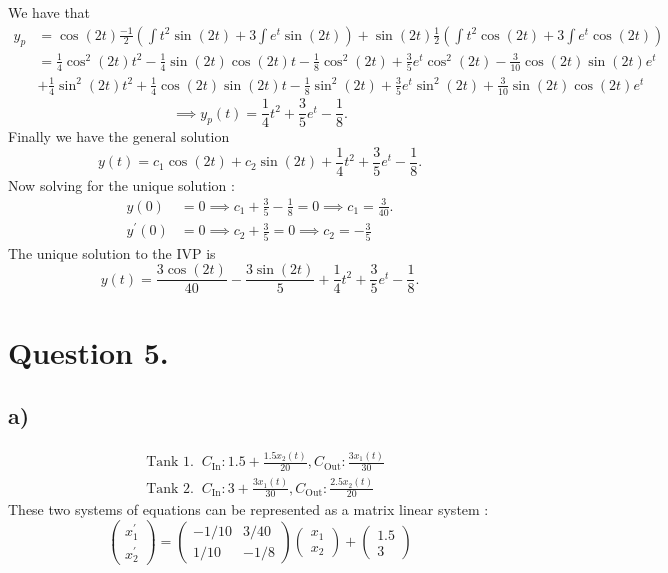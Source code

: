 \documentclass[
	12pt,
	]{article}
\newcommand{\p}{\prime}
\theoremstyle{definition}
\theoremstyle{definition}
\theoremstyle{definition}
\theoremstyle{definition}
\theoremstyle{definition}
\theoremstyle{example}
\theoremstyle{note}
\theoremstyle{remark}
\theoremstyle{example}
\begin{document}
 			 	We have that 
 			 	\begin{align*}
 			 		y_{p} &= \cos(2t)\frac{-1}{2} \left(\int t^{2}\sin(2t) + 3 \int e^{t}\sin(2t)\right) + \sin(2t)\frac{1}{2} \left(\int t^{2}\cos(2t) + 3 \int e^{t}\cos(2t)\right) \\
 			 		&= \frac{1}{4}\cos^{2}(2t)t^{2} -\frac14 \sin(2t)\cos(2t) t- \frac18 \cos^{2}(2t) + \frac{3}{5}e^{t}\cos^{2}(2t) -\frac{3}{10} \cos(2t)\sin(2t)e^{t} \\
 			 		\ \ &+ \frac14 \sin^{2}(2t) t^{2} + \frac14 \cos(2t)\sin(2t) t -\frac{1}{8}\sin^{2}(2t) + \frac35 e^{t}\sin^{2}(2t) + \frac{3}{10}\sin(2t)\cos(2t) e^{t} 
 			 	\end{align*}
 			 	$$\implies y_{p}(t) = \frac14 t^{2} +\frac35 e^{t} - \frac18. $$
 			 	Finally we have the general solution 
 			 	$$ y(t) = c_{1}\cos(2t) + c_{2}\sin(2t) + \frac14 t^{2} +\frac35 e^{t} - \frac18 .$$
 			 	Now solving for the unique solution : 
 			 	\begin{align*}
 			 		y(0) &=0 \implies c_{1} + \frac35 -\frac18 =0 \implies c_{1} = \frac{3}{40}. \\
 			 		y^{\p}(0) &=0 \implies c_{2} + \frac35 =0 \implies c_{2} = -\frac35
 			 	\end{align*}
 			 	The unique solution to the IVP is
 			 	\begin{equation*}
 			 		y(t) = \frac{3\cos(2t)}{40} -\frac{3\sin(2t)}{5} + \frac14 t^{2} +\frac35 e^{t} - \frac18.
 			 	\end{equation*}
 			 \section*{Question 5.}
 			 	\subsection*{a) }
 			 		\begin{align*}
 			 			& \text{Tank 1. } \ C_{\text{In}} : 1.5 + \frac{1.5x_{2}(t)}{20}, C_{\text{Out}} : \frac{3x_{1}(t)}{30} \\
 			 			& \text{Tank 2. } \ C_{\text{In}} : 3 + \frac{3x_{1}(t)}{30}, C_{\text{Out}} : \frac{2.5x_{2}(t)}{20}
 			 		\end{align*}
 			 		These two systems of equations can be represented as a matrix linear system : 
 			 		\begin{equation*}
 			 			\begin{pmatrix}
 			 				x_{1}^{\p} \\
 			 				x_{2}^{\p}
 			 			\end{pmatrix}
 			 			= 
 			 			\begin{pmatrix}
 			 				-1/10 & 3/40 \\
 			 				1/10 & -1/8
 			 			\end{pmatrix}
 			 			\begin{pmatrix}
 			 				x_{1} \\
 			 				x_{2}
 			 			\end{pmatrix}
 			 			+ 
 			 			\begin{pmatrix}
 			 				1.5 \\
 			 				3
 			 			\end{pmatrix}
 			 		\end{equation*}
\end{document}
